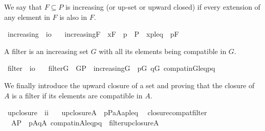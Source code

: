 We say that $F\subseteq P$ is increasing (or up-set or upward closed) if every
extension of any element in $F$ is also in $F$.
\begin{isabelle}
\isamarkupfalse%
\ increasing\ {\isacharcolon}{\isacharcolon}\ {\isachardoublequoteopen}i{\isasymRightarrow}o{\isachardoublequoteclose}\ \isanewline
\ \ {\isachardoublequoteopen}increasing{\isacharparenleft}F{\isacharparenright}\ {\isacharequal}{\isacharequal}\ {\isasymforall}x{\isasymin}F{\isachardot}\ {\isasymforall}\ p\ {\isasymin}\ P\ {\isachardot}\ {\isasymlangle}x{\isacharcomma}p{\isasymrangle}{\isasymin}leq\ {\isasymlongrightarrow}\ p{\isasymin}F{\isachardoublequoteclose}
\end{isabelle}
A filter is an increasing set $G$ with all its elements being compatible in $G$.
\begin{isabelle}
\isamarkupfalse%
\ filter\ {\isacharcolon}{\isacharcolon}\ {\isachardoublequoteopen}i{\isasymRightarrow}o{\isachardoublequoteclose}\ \isanewline
\ \ {\isachardoublequoteopen}filter{\isacharparenleft}G{\isacharparenright}\ {\isacharequal}{\isacharequal}\ G{\isasymsubseteq}P\ {\isasymand}\ increasing{\isacharparenleft}G{\isacharparenright}\ {\isasymand}\ {\isacharparenleft}{\isasymforall}p{\isasymin}G{\isachardot}\ {\isasymforall}q{\isasymin}G{\isachardot}\ compat{\isacharunderscore}in{\isacharparenleft}G{\isacharcomma}leq{\isacharcomma}p{\isacharcomma}q{\isacharparenright}{\isacharparenright}{\isachardoublequoteclose}
\end{isabelle}

We finally introduce the upward closure of a set
and proving that the closure of $A$ is a filter if its elements are
compatible in $A$.
\begin{isabelle}
\isamarkupfalse%
\ upclosure\ {\isacharcolon}{\isacharcolon}\ {\isachardoublequoteopen}i{\isasymRightarrow}i{\isachardoublequoteclose}\ \isanewline
\ \ {\isachardoublequoteopen}upclosure{\isacharparenleft}A{\isacharparenright}\ {\isacharequal}{\isacharequal}\ {\isacharbraceleft}p{\isasymin}P{\isachardot}{\isasymexists}a{\isasymin}A{\isachardot}{\isasymlangle}a{\isacharcomma}p{\isasymrangle}{\isasymin}leq{\isacharbraceright}{\isachardoublequoteclose}\isanewline
{}\isamarkupfalse%
\ \ closure{\isacharunderscore}compat{\isacharunderscore}filter{\isacharcolon}
\ \ {\isachardoublequoteopen}A{\isasymsubseteq}P\ {\isasymLongrightarrow}\ {\isacharparenleft}{\isasymforall}p{\isasymin}A{\isachardot}{\isasymforall}q{\isasymin}A{\isachardot}\ compat{\isacharunderscore}in{\isacharparenleft}A{\isacharcomma}leq{\isacharcomma}p{\isacharcomma}q{\isacharparenright}{\isacharparenright}\ {\isasymLongrightarrow}\ filter{\isacharparenleft}upclosure{\isacharparenleft}A{\isacharparenright}{\isacharparenright}{\isachardoublequoteclose}
\end{isabelle}



